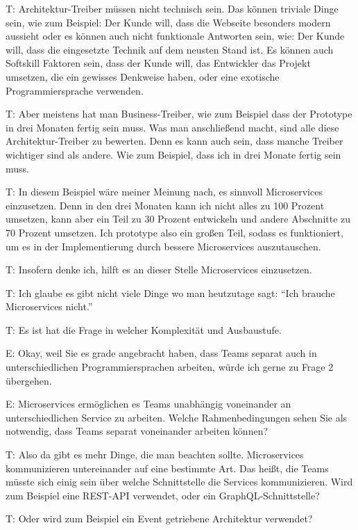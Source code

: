 T: Architektur-Treiber müssen nicht technisch sein. Das können triviale Dinge sein, wie zum Beispiel: Der Kunde will, dass die Webseite besonders modern aussieht oder es können auch nicht funktionale Antworten sein, wie: Der Kunde will, dass die eingesetzte Technik auf dem neusten Stand ist. Es können auch Softskill Faktoren sein, dass der Kunde will, das Entwickler das Projekt umsetzen, die ein gewisses Denkweise haben, oder eine exotische Programmiersprache verwenden. 

\label{appendix:t-15}
T: Aber meistens hat man Business-Treiber, wie zum Beispiel dass der Prototype in drei Monaten fertig sein muss. Was man anschließend macht, sind alle diese Architektur-Treiber zu bewerten. Denn es kann auch sein, dass manche Treiber wichtiger sind als andere. Wie zum Beispiel, dass ich in drei Monate fertig sein muss. 

\label{appendix:t-16}
T: In diesem Beispiel wäre meiner Meinung nach, es sinnvoll Microservices einzusetzen. Denn in den drei Monaten kann ich nicht alles zu 100 Prozent umsetzen, kann aber ein Teil zu 30 Prozent entwickeln und andere Abschnitte zu 70 Prozent umsetzen. Ich prototype also ein großen Teil, sodass es funktioniert, um es in der Implementierung durch bessere Microservices auszutauschen. 

T: Insofern denke ich, hilft es an dieser Stelle Microservices einzusetzen.

\label{appendix:t-17}
T: Ich glaube es gibt nicht viele Dinge wo man heutzutage sagt: “Ich brauche Microservices nicht.”

\label{appendix:t-18}
T: Es ist hat die Frage in welcher Komplexität und Ausbaustufe.

E: Okay, weil Sie es grade angebracht haben, dass Teams separat auch in unterschiedlichen Programmiersprachen arbeiten, würde ich gerne zu Frage 2 übergehen.

E: Microservices ermöglichen es Teams unabhängig voneinander an unterschiedlichen Service zu arbeiten. Welche Rahmenbedingungen sehen Sie als notwendig, dass Teams separat voneinander arbeiten können?

\label{appendix:t-19}
T: Also da gibt es mehr Dinge, die man beachten sollte. Microservices kommunizieren untereinander auf eine bestimmte Art. Das heißt, die Teams müsste sich einig sein über welche Schnittstelle die Services kommunizieren. Wird zum Beispiel eine REST-API verwendet, oder ein GraphQL-Schnittstelle?
 
 \label{appendix:t-20}
T: Oder wird zum Beispiel ein Event getriebene Architektur verwendet?

